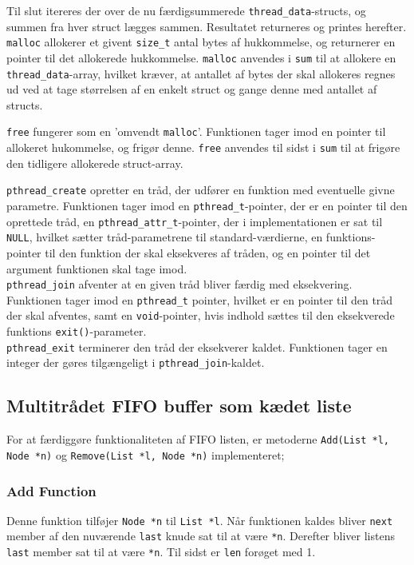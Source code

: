 Til slut itereres der over de nu færdigsummerede \texttt{thread\_data}-structs, og summen fra hver struct lægges sammen. Resultatet returneres og printes herefter. \\ 

\texttt{malloc} allokerer et givent \texttt{size\_t} antal bytes af hukkommelse, og returnerer en pointer til det allokerede hukkommelse. \texttt{malloc} anvendes i \texttt{sum} til at allokere en \texttt{thread\_data}-array, hvilket kræver, at antallet af bytes der skal allokeres regnes ud ved at tage størrelsen af en enkelt struct og gange denne med antallet af structs.

\texttt{free} fungerer som en 'omvendt \texttt{malloc}'. Funktionen tager imod en pointer til allokeret hukommelse, og frigør denne. \texttt{free} anvendes til sidst i \texttt{sum} til at frigøre den tidligere allokerede struct-array. 

\texttt{pthread\_create} opretter en tråd, der udfører en funktion med eventuelle givne parametre. 
Funktionen tager imod en \texttt{pthread\_t}-pointer, der er en pointer til den oprettede tråd, en \texttt{pthread\_attr\_t}-pointer, der i implementationen er sat til \texttt{NULL}, hvilket sætter tråd-parametrene til standard-værdierne, en funktions-pointer til den funktion der skal eksekveres af tråden, og en pointer til det argument funktionen skal tage imod. \\

\texttt{pthread\_join} afventer at en given tråd bliver færdig med eksekvering. 
Funktionen tager imod en \texttt{pthread\_t} pointer, hvilket er en pointer til den tråd der skal afventes, samt en \texttt{void}-pointer, hvis indhold sættes til den eksekverede funktions \texttt{exit()}-parameter.\\

\texttt{pthread\_exit} terminerer den tråd der eksekverer kaldet. Funktionen tager en integer der gøres tilgængeligt i \texttt{pthread\_join}-kaldet.

\subsection{Multitrådet FIFO buffer som kædet liste}
\label{list}
For at færdiggøre funktionaliteten af FIFO listen, er metoderne \texttt{Add(List *l, Node *n)} og \texttt{Remove(List *l, Node *n)} implementeret;

\subsubsection{Add Function}
Denne funktion tilføjer \texttt{Node *n} til \texttt{List *l}. Når funktionen kaldes bliver \texttt{next} member af den nuværende \texttt{last} knude sat til at være \texttt{*n}. Derefter bliver listens \texttt{last} member sat til at være \texttt{*n}. Til sidst er \texttt{len} forøget med 1.

